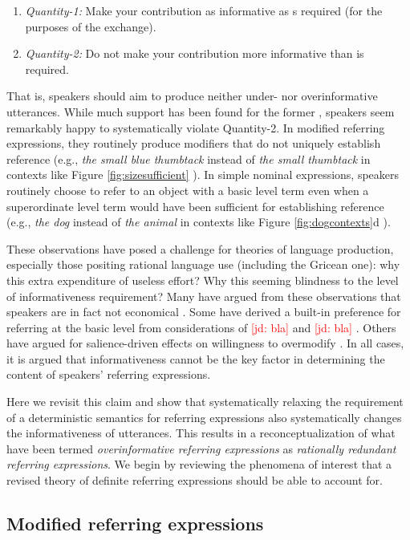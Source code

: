 \documentclass[11pt]{article}
\newcommand{\jd}[1]{\textcolor{Red}{[jd: #1]}}
\newcommand{\figref}[1]{Figure \ref{#1}}
\begin{document}
\begin{enumerate}
	\item \emph{Quantity-1:} Make your contribution as informative as s required (for the purposes of the exchange).
	\item \emph{Quantity-2:} Do not make your contribution more informative than is required.
\end{enumerate}

That is, speakers should aim to produce neither under- nor overinformative utterances. While much support has been found for the former \cite{lots of people}, speakers seem remarkably happy to systematically violate Quantity-2. In modified referring expressions, they routinely produce modifiers that do not uniquely establish reference (e.g., \emph{the small blue thumbtack} instead of \emph{the small thumbtack} in contexts like \figref{fig:sizesufficient} \cite{bla bla}). In simple nominal expressions, speakers routinely choose to refer to an object with a basic level term even when a superordinate level term would have been sufficient for establishing reference (e.g., \emph{the dog} instead of \emph{the animal} in contexts like \figref{fig:dogcontexts}d \cite{bla bla}).

These observations have posed a challenge for theories of language production, especially those positing rational language use (including the Gricean one): why this extra expenditure of useless effort? Why this seeming blindness to the level of informativeness requirement? Many have argued from these observations that speakers are in fact not economical \cite{bla}. Some have derived a built-in preference for referring at the basic level from considerations of \jd{bla} and \jd{bla} \cite{Rosch1976}. Others have argued for salience-driven effects on willingness to overmodify \cite{dutch guys}. In all cases, it is argued that informativeness cannot be the key factor in determining the content of speakers' referring expressions.

Here we revisit this claim and show that systematically relaxing the requirement of a deterministic semantics for referring expressions also systematically changes the informativeness of utterances. This results in a reconceptualization of what have been termed \emph{overinformative referring expressions} as \emph{rationally redundant referring expressions}. We begin by reviewing the phenomena of interest that a revised theory of definite referring expressions should be able to account for. 

\subsection{Modified referring expressions}
\label{sec:modified}
\end{document}
